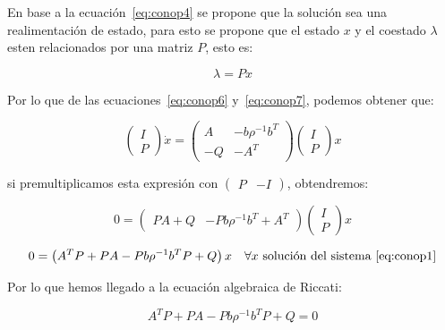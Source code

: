     En base a la ecuación~\ref{eq:conop4} se propone que la solución sea una realimentación de estado, para esto se propone que el estado $x$ y el coestado $\lambda$ esten relacionados por una matriz $P$, esto es:

    \begin{equation} \label{eq:conop7}
        \lambda = P x
    \end{equation}

    Por lo que de las ecuaciones~\ref{eq:conop6} y~\ref{eq:conop7}, podemos obtener que:

    \begin{equation*}
        \begin{pmatrix}
            I \\
            P
        \end{pmatrix} \dot{x}=
        \begin{pmatrix}
            A & -b \rho^{-1} b^T \\
            - Q & - A^T
        \end{pmatrix}
        \begin{pmatrix}
            I \\
            P
        \end{pmatrix} x
    \end{equation*}

    si premultiplicamos esta expresión con $\begin{pmatrix} P & -I \end{pmatrix}$, obtendremos:

    \begin{equation*}
        0 =
        \begin{pmatrix}
            P A + Q & -P b \rho^{-1} b^T + A^T
        \end{pmatrix}
        \begin{pmatrix}
            I \\
            P
        \end{pmatrix} x
    \end{equation*}

    \begin{equation*}
        0 = \left( A^T P + P A - P b \rho^{-1} b^T P + Q \right) x \quad \forall x \text{ solución del sistema~\ref{eq:conop1}}
    \end{equation*}

    Por lo que hemos llegado a la ecuación algebraica de Riccati:

    \begin{equation} \label{eq:conop8}
        A^T P + P A - P b \rho^{-1} b^T P + Q = 0
    \end{equation}

